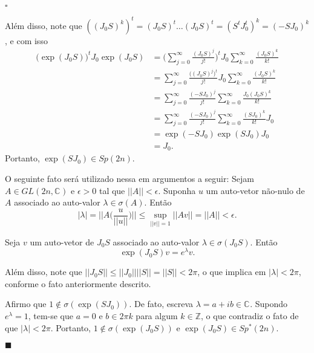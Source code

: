 \documentclass[12pt]{book}
\newenvironment{prova}[1]{$\square$ #1}{\hfill$\blacksquare$}
\newcommand{\bigparenteses}[1]{\Big( #1 \Big) }
\newcommand{\complexo}[1]{\mathbb{C}^{#1}}
\newcommand{\espectrooperador}[1]{\sigma(#1)}
\newcommand{\estruturacomplexa}{J_{0}}
\newcommand{\generalgroup}[2]{GL(#1, #2)}
\newcommand{\generalgroupcomplexo}[1]{\generalgroup{#1}{\complexo{}}}
\newcommand{\gruposimpletico}[1]{Sp(#1)}
\newcommand{\gruposimpleticonaodegenerado}[1]{Sp^{#1}(2n)}
\newcommand{\inteiros}{\mathbb{Z}}
\newcommand{\norma}[1]{||#1||}
\newcommand{\normagrande}[1]{\Big|\Big|#1\Big|\Big|}
\begin{document}
\begin{prova}
\begin{enumerate}
			Além disso, note que $((\estruturacomplexa S)^{k})^{t} = (\estruturacomplexa S)^{t}\dots (\estruturacomplexa S)^{t} = (S^{t}\estruturacomplexa^{t} )^{k} = (-S\estruturacomplexa)^{k}$, e com isso
			$$
			\begin{aligned}
			\big(\exp(\estruturacomplexa S)\big)^{t}\estruturacomplexa\exp(\estruturacomplexa S)
			&=\Big(\sum_{j=0}^{\infty}\frac{ (\estruturacomplexa S)^{j}}{j!}\Big)^{t} \estruturacomplexa \sum_{k=0}^{\infty}\frac{(\estruturacomplexa S)^{k}}{k!}
			\\
			&=\sum_{j=0}^{\infty}\frac{\big( (\estruturacomplexa S)^{j}\big)^{t}}{j!}\estruturacomplexa \sum_{k=0}^{\infty}\frac{(\estruturacomplexa S)^{k}}{k!}
			\\
			&=\sum_{j=0}^{\infty}\frac{(-S\estruturacomplexa)^{j}}{j!} \sum_{k=0}^{\infty}\frac{\estruturacomplexa(\estruturacomplexa S)^{k}}{k!}
			\\
			&=\sum_{j=0}^{\infty}\frac{(-S\estruturacomplexa)^{j}}{j!} \sum_{k=0}^{\infty}\frac{(S\estruturacomplexa)^{k}}{k!}\estruturacomplexa
			\\
			&=\exp(-S\estruturacomplexa)\exp(S\estruturacomplexa)\estruturacomplexa
			\\
			&=\estruturacomplexa.
			\end{aligned}
			$$
			Portanto, $\exp(S\estruturacomplexa) \in \gruposimpletico{2n}$. 
			
			O seguinte fato será utilizado nessa em argumentos a seguir: Sejam $A \in \generalgroupcomplexo{2n}$ e $\epsilon>0$ tal que $\norma{A}<\epsilon$. Suponha $u$ um auto-vetor não-nulo de $A$ associado ao auto-valor $\lambda\in \espectrooperador{A}$. Então 
			$$
				|\lambda|=\normagrande{A\bigparenteses{\frac{u}{\norma{u}}} }\leq \sup_{\norma{v}=1 } \norma{Av} = \norma{A}<\epsilon.
			$$
				
			
			Seja $v$ um auto-vetor de $\estruturacomplexa S$ associado ao auto-valor $\lambda \in \espectrooperador{\estruturacomplexa S}$. Então 
			$$
			\exp(\estruturacomplexa S)v = e^{\lambda}v.
			$$
			
			Além disso, note que $\norma{\estruturacomplexa S}\leq \norma{\estruturacomplexa}\norma{S} = \norma{S} <2\pi$, o que implica em $|\lambda|<2\pi$, conforme o fato anteriormente descrito.
			
			Afirmo que $1\notin \espectrooperador{\exp(S\estruturacomplexa)}$. De fato, escreva $\lambda = a+ib\in \complexo{}$. Supondo $e^{\lambda} = 1$, tem-se que $a=0$ e $b \in 2\pi k$ para algum $k\in \inteiros$, o que contradiz o fato de que $|\lambda| <2\pi$. Portanto, $1\notin\espectrooperador{\exp(\estruturacomplexa S)}$ e $\exp(\estruturacomplexa S)\in \gruposimpleticonaodegenerado{*}$.
			

\end{enumerate}
\end{prova}
\end{document}
